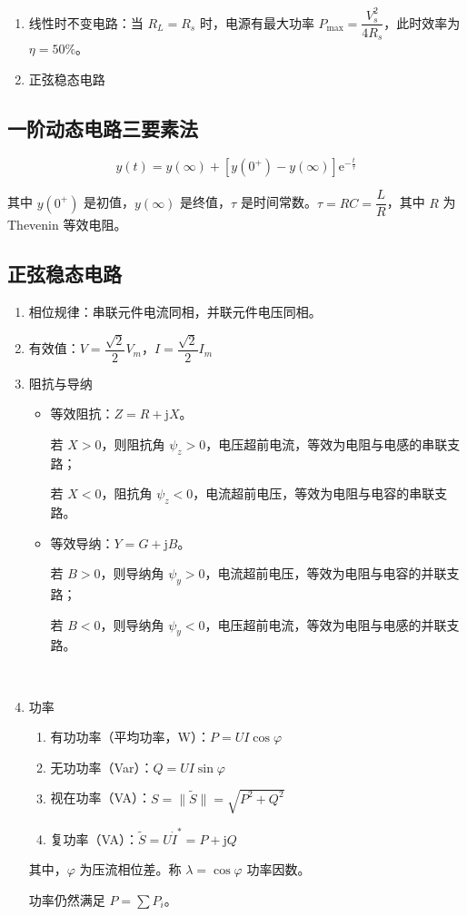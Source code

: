 \documentclass[UTF8,fontset=fandol,zihao=5]{ctexart}
\newcommand{\jj}{\mathrm{j}}
\begin{document}
\begin{enumerate}
  \item 线性时不变电路：当 \(R_L=R_s\) 时，电源有最大功率 \(P_{\max}=\dfrac{V_s^2}{4R_s}\)，此时效率为 \(\eta=50\%\)。
  \item 正弦稳态电路
\end{enumerate}

\subsection{一阶动态电路三要素法}

\[
  y(t)=y(\infty)+[y(0^+)-y(\infty)]\mathrm{e}^{-\frac{t}{\tau}}
\]

其中 \(y(0^+)\) 是初值，\(y(\infty)\) 是终值，\(\tau\) 是时间常数。\(\tau=RC=\dfrac{L}{R}\)，其中 \(R\) 为 Thevenin 等效电阻。

\subsection{正弦稳态电路}

\begin{enumerate}
  \item 相位规律：串联元件电流同相，并联元件电压同相。

  \item 有效值：\(V=\dfrac{\sqrt{2}}{2}V_m\)，\(I=\dfrac{\sqrt{2}}{2}I_m\)

  \item 阻抗与导纳
  \begin{itemize}
    \item 等效阻抗：\(Z=R+\jj X\)。
    
    若 \(X>0\)，则阻抗角 \(\psi_z>0\)，电压超前电流，等效为电阻与电感的串联支路；

    若 \(X<0\)，阻抗角 \(\psi_z<0\)，电流超前电压，等效为电阻与电容的串联支路。

    \item 等效导纳：\(Y=G+\jj B\)。
    
    若 \(B>0\)，则导纳角 \(\psi_y>0\)，电流超前电压，等效为电阻与电容的并联支路；

    若 \(B<0\)，则导纳角 \(\psi_y<0\)，电压超前电流，等效为电阻与电感的并联支路。
  \end{itemize}\

  \item 功率

  \begin{enumerate}[label=(\arabic*)]
    \item 有功功率（平均功率，W）：\(P=UI\cos\varphi\)
    \item 无功功率（Var）：\(Q=UI\sin\varphi\)
    \item 视在功率（VA）：\(S=\lVert\widetilde S\rVert=\sqrt{P^2+Q^2}\)
    \item 复功率（VA）：\(\widetilde S=U\dot I^*=P+\jj Q\)
  \end{enumerate}

  其中，\(\varphi\) 为压流相位差。称 \(\lambda=\cos\varphi\) 功率因数。

  功率仍然满足 \(P=\displaystyle\sum P_i\)。
\end{enumerate}
\end{document}
